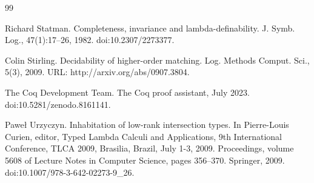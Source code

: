 \documentclass[10pt,a4paper]{amsart}
\begin{document}
\begin{thebibliography}{99}
\par\noindent  [17]  Richard Statman.  Completeness, invariance and lambda-definability.  J. Symb. Log., 47(1):17–26, 1982.  doi:10.2307/2273377.  
 
\par\noindent  [18]  Colin Stirling.  Decidability of higher-order matching.  Log. Methods Comput. Sci., 5(3), 2009.  URL: http://arxiv.org/abs/0907.3804.  
 
\par\noindent  [19]  The Coq Development Team.  The Coq proof assistant, July 2023.  doi:10.5281/zenodo.8161141.  
 
\par\noindent  [20]  Paweł Urzyczyn.  Inhabitation of low-rank intersection types.  In Pierre-Louis Curien, editor, Typed Lambda Calculi and Applications, 9th International Conference, TLCA 2009, Brasilia, Brazil, July 1-3, 2009. Proceedings, volume 5608 of Lecture Notes in Computer Science, pages 356–370. Springer, 2009.  doi:10.1007/978-3-642-02273-9\_26.  
  
\end{thebibliography}
\end{document}
